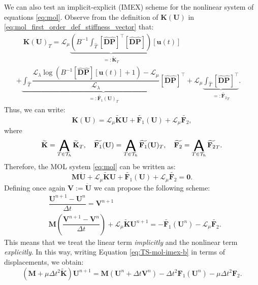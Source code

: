 \documentclass{sfuthesis}
\numberwithin{equation}{section}
\numberwithin{figure}{chapter}
\numberwithin{table}{chapter}
\theoremstyle{definition}
\def\*#1{{\mathbf{#1}}} %
\DeclareMathOperator*{\assembly}{\scalerel*{\mathsf{A}}{\sum}}
\begin{document}
We can also test an implicit-explicit (IMEX) scheme for the nonlinear system of equations \eqref{eq:mol}. Observe from the definition of $\*K(\*U)$ in \eqref{eq:mol_first_order_def_stiffness_vector} that:
\begin{multline}
    \quad \*K(\*U)_T = \mathcal{L}_\mu \underbrace{\left( B^{-1} \int_{\widehat{T}} [\widehat{\*D} \widehat{\*P}]^\top [\widehat{\*D} \widehat{\*P}] \right)}_{=: \widetilde{\*K}_T} [\*u(t)] \\
    + \underbrace{\int_{\widehat{T}} \dfrac{\mathcal{L}_\lambda \log \left( B^{-1}[\widehat{\*D} \widehat{\*P}] [\*u(t)] + 1 \right) - \mathcal{L}_\mu}{\mathcal{L}_\lambda} [\widehat{\*D} \widehat{\*P}]^\top}_{=: \widetilde{\*F_1}(\*U)_T} + \mathcal{L}_\mu \underbrace{\int_{\widehat{T}} [\widehat{\*D} \widehat{\*P}]^\top}_{=: \widetilde{\*F_2}_T}. \quad
\end{multline}
Thus, we can write:
\begin{equation}
    \*K(\*U) = \mathcal{L}_\mu \widetilde{\*K} \*U + \widetilde{\*F_1}(\*U) + \mathcal{L}_\mu \widetilde{\*F_2},
\end{equation}
where 
\begin{equation}
    \widetilde{\*K} = \assembly_{T \in \mathcal{T}_h} \widetilde{\*K}_T, \quad \widetilde{\*F_1}(\*U) = \assembly_{T \in \mathcal{T}_h} \widetilde{\*F_1}(\*U)_T, \quad \widetilde{\*F_2} = \assembly_{T \in \mathcal{T}_h} \widetilde{\*F_2}_T.
\end{equation}
Therefore, the MOL system \eqref{eq:mol} can be written as:
\[
	\*M \ddot{\*U} + \mathcal{L}_\mu \widetilde{\*K} \*U + \widetilde{\*F_1}(\*U) + \mathcal{L}_\mu\widetilde{\*F_2} = \*0.
\]
Defining once again $\*V:=\dot{\*U}$ we can propose the following scheme:
\begin{subequations} \label{eq:TS-mol-imex}
    \begin{align}
        &\dfrac{\*U^{n+1} - \*U^n}{\Delta t} = \*V^{n+1} \\
	    \label{eq:TS-mol-imex-b} &\*M \left( \dfrac{\*V^{n+1} - \*V^n}{\Delta t} \right) + \mathcal{L}_\mu \widetilde{\*K} \*U^{n+1} = -\widetilde{\*F_1}(\*U^n) - \mathcal{L}_\mu \widetilde{\*F_2}.
    \end{align}
\end{subequations}
This means that we treat the linear term \textit{implicitly} and the nonlinear term \textit{explicitly}. In this way, writing Equation \eqref{eq:TS-mol-imex-b} in terms of displacements, we obtain:
\begin{equation}
	\left( \*M + \mu \Delta t^2 \widetilde{\*K} \right)\*U^{n+1} = \*M(\*U^n + \Delta t \*V^n) - \Delta t^2 \*F_1(\*U^n) - \mu \Delta t^2 \*F_2.
\end{equation}
\end{document}
